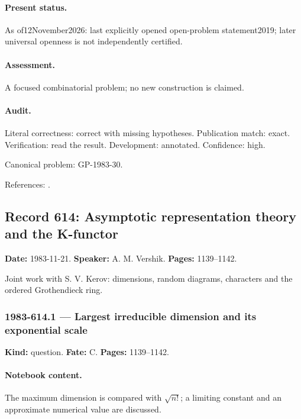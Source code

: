 \paragraph{Present status.} As of12November2026: last explicitly opened open-problem statement2019; later universal openness is not independently certified.

\paragraph{Assessment.} A focused combinatorial problem; no new construction is claimed.

\paragraph{Audit.} Literal correctness: correct with missing hypotheses. Publication match: exact. Verification: read the result. Development: annotated. Confidence: high.

\noindent Canonical problem: GP-1983-30.\par

\noindent References: \citep{stanton2019problems,stanton2019rankcrank}.\par

\subsection{Record 614: Asymptotic representation theory and the K-functor}

\label{talk:614}

\noindent\textbf{Date:} 1983-11-21. \textbf{Speaker:} A. M. Vershik. \textbf{Pages:} 1139--1142.\par

Joint work with S. V. Kerov: dimensions, random diagrams, characters and the ordered Grothendieck ring.

\subsubsection{1983-614.1 --- Largest irreducible dimension and its exponential scale}

\label{item:1983-614.1}

\noindent\textbf{Kind:} question. \textbf{Fate:} C. \textbf{Pages:} 1139--1142.\par

\paragraph{Notebook content.} The maximum dimension is compared with $\sqrt{n!}$; a limiting constant and an approximate numerical value are discussed.

